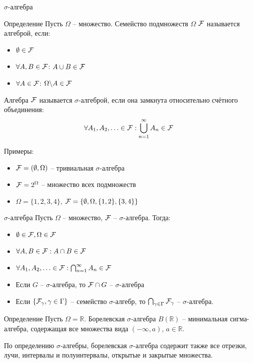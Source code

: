 \documentclass{beamer}
\begin{document}
\begin{frame}{$\sigma$-алгебра}
    \begin{block}{Определение}
        Пусть $\Omega$ -- множество. Семейство подмножеств $\Omega$ $\mathcal{F}$ называется алгеброй, если:
        \begin{itemize}
            \item $\emptyset \in \mathcal{F}$
            \item $\forall A, B \in \mathcal{F}$: $A\cup B\in \mathcal{F}$
            \item $\forall A \in \mathcal{F}$: $\Omega\backslash A \in \mathcal{F}$
        \end{itemize}
    \end{block}
    Алгебра $\mathcal{F}$ называется $\sigma$-алгеброй, если она замкнута относительно счётного объединения: 
    $$\forall A_1, A_2, \ldots \in \mathcal{F}: \bigcup_{n=1}^{\infty} A_n \in \mathcal{F}$$

    Примеры:
    \begin{itemize}
        \item $\mathcal{F}=(\emptyset, \Omega)$ -- тривиальная $\sigma$-алгебра
        \item $\mathcal{F}=2^{\Omega}$ -- множество всех подмножеств
        \item $\Omega = \{1,2,3,4\}$, $\mathcal{F}=\{ \emptyset, \Omega, \{1, 2\}, \{3, 4\} \}$
    \end{itemize}
\end{frame}

\begin{frame}{$\sigma$-алгебра}
    Пусть $\Omega$ -- множество, $\mathcal{F}$ -- $\sigma$-алгебра. Тогда:
    \begin{itemize}
        \item $\emptyset \in \mathcal{F}, \Omega \in \mathcal{F}$
        \item $\forall A, B \in \mathcal{F}: A\cap B\in \mathcal{F}$
        \item $\forall A_1, A_2, \ldots \in \mathcal{F}: \bigcap_{n=1}^{\infty} A_n \in \mathcal{F}$
        \item Если $G$ -- $\sigma$-алгебра, то $\mathcal{F}\cap G$ -- $\sigma$-алгебра
        \item Если $\{\mathcal{F}_{\gamma}, \gamma\in\Gamma\}$ -- семейство $\sigma$-алгебр, то $\bigcap_{\gamma \in \Gamma} \mathcal{F}_{\gamma}$ -- $\sigma$-алгебра.
    \end{itemize}
    \begin{block}{Определение}
        Пусть $\Omega=\mathbb{R}$. Борелевская $\sigma$-алгебра $B(\mathbb{R})$ -- минимальная сигма-алгебра, содержащая все множества вида $(-\infty, a)$, $a\in \mathbb{R}$.
    \end{block}

    По определению $\sigma$-алгебры, борелевская $\sigma$-алгебра содержит также все отрезки, лучи, интервалы и полуинтервалы, открытые и закрытые множества.
\end{frame}
\end{document}
